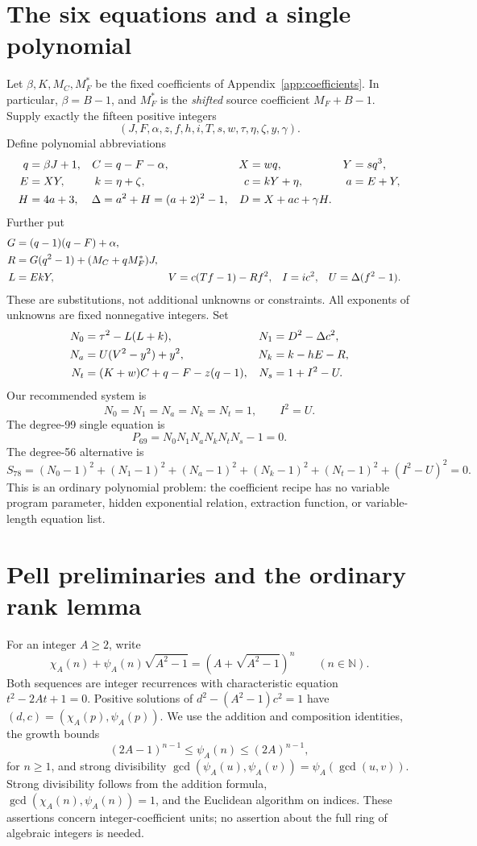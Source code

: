 \documentclass[11pt,a4paper]{article}
\theoremstyle{remark}\newtheorem{remark}[theorem]{Remark}
\newcommand{\N}{\mathbb N}
\begin{document}
\section{The six equations and a single polynomial}\label{sec:formulas}
Let $\beta,K,M_C,M_F^*$ be the fixed coefficients of
Appendix~\ref{app:coefficients}. In particular, $\beta=B-1$, and
$M_F^*$ is the \emph{shifted} source coefficient $M_F+B-1$.
Supply exactly the fifteen positive integers
\[
 (J,F,\alpha,z,f,h,i,T,s,w,\tau,\eta,\zeta,y,\gamma).
\]
Define polynomial abbreviations
\begin{align}
 q&=\beta J+1,& C&=q-F-\alpha,& X&=wq,&Y&=sq^3,\notag\\
 E&=XY,&k&=\eta+\zeta,&c&=kY+\eta,&a&=E+Y,\notag\\
 H&=4a+3,&\Delta&=a^2+H=(a+2)^2-1,&
 D&=X+ac+\gamma H.\label{eq:abbrev}
\end{align}
Further put
\begin{align}
 G&=(q-1)(q-F)+\alpha,\notag\\
 R&=G(q^2-1)+(M_C+qM_F^*)J,\notag\\
 L&=EkY,&V&=c(Tf-1)-Rf^2,&I&=ic^2,&U&=\Delta(f^2-1).
 \label{eq:packing}
\end{align}
These are substitutions, not additional unknowns or constraints.
All exponents of unknowns are fixed nonnegative integers.
Set
\begin{align}
 N_0&=\tau^2-L(L+k),&N_1&=D^2-\Delta c^2,\notag\\
 N_a&=U(V^2-y^2)+y^2,&N_k&=k-hE-R,\notag\\
 N_t&=(K+w)C+q-F-z(q-1),&N_s&=1+I^2-U.
 \label{eq:factors}
\end{align}
Our recommended system is
\[
 \boxed{N_0=N_1=N_a=N_k=N_t=1,\qquad I^2=U.}
 \tag{S}\label{eq:system}
\]
The degree-99 single equation is
\[
 \boxed{P_{69}=N_0N_1N_aN_kN_tN_s-1=0.}
 \tag{P}\label{eq:product}
\]
The degree-56 alternative is
\[
 \boxed{S_{78}=(N_0-1)^2+(N_1-1)^2+(N_a-1)^2
 +(N_k-1)^2+(N_t-1)^2+(I^2-U)^2=0.}
 \tag{SOS}\label{eq:sos}
\]
This is an ordinary polynomial problem: the coefficient recipe has no
variable program parameter, hidden exponential relation, extraction
function, or variable-length equation list.

\section{Pell preliminaries and the ordinary rank lemma}
For an integer $A\ge2$, write
\[
 \chi_A(n)+\psi_A(n)\sqrt{A^2-1}
 =(A+\sqrt{A^2-1})^n\qquad(n\in\N).
\]
Both sequences are integer recurrences with characteristic equation
$t^2-2At+1=0$. Positive solutions of
$d^2-(A^2-1)c^2=1$ have $(d,c)=(\chi_A(p),\psi_A(p))$.
We use the addition and composition identities, the growth bounds
\[
 (2A-1)^{n-1}\le\psi_A(n)\le(2A)^{n-1},
\]
for $n\ge1$, and strong divisibility
$\gcd(\psi_A(u),\psi_A(v))=\psi_A(\gcd(u,v))$.
Strong divisibility follows from the addition formula,
$\gcd(\chi_A(n),\psi_A(n))=1$, and the Euclidean algorithm on indices.
These assertions concern integer-coefficient units; no assertion about
the full ring of algebraic integers is needed.
\end{document}
